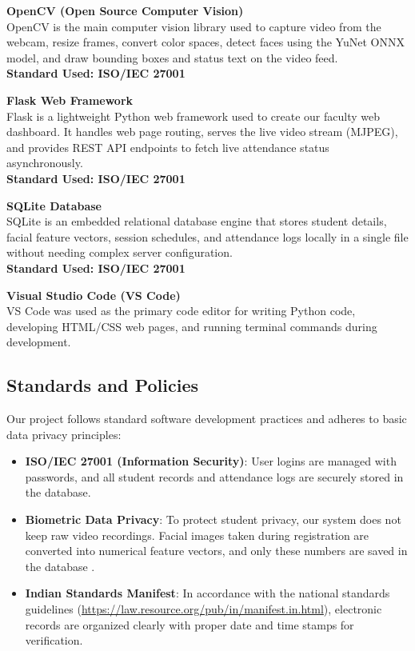 \documentclass[10pt]{report}
\begin{document}
\noindent\textbf{OpenCV (Open Source Computer Vision)}\\
OpenCV is the main computer vision library used to capture video from the webcam, resize frames, convert color spaces, detect faces using the YuNet ONNX model, and draw bounding boxes and status text on the video feed.\\
\textbf{Standard Used: ISO/IEC 27001}

\noindent\textbf{Flask Web Framework}\\
Flask is a lightweight Python web framework used to create our faculty web dashboard. It handles web page routing, serves the live video stream (MJPEG), and provides REST API endpoints to fetch live attendance status asynchronously.\\
\textbf{Standard Used: ISO/IEC 27001}

\noindent\textbf{SQLite Database}\\
SQLite is an embedded relational database engine that stores student details, facial feature vectors, session schedules, and attendance logs locally in a single file without needing complex server configuration.\\
\textbf{Standard Used: ISO/IEC 27001}

\noindent\textbf{Visual Studio Code (VS Code)}\\
VS Code was used as the primary code editor for writing Python code, developing HTML/CSS web pages, and running terminal commands during development.

\subsection{Standards and Policies}
\hspace{0.5cm}Our project follows standard software development practices and adheres to basic data privacy principles:
\begin{itemize}
    \item \textbf{ISO/IEC 27001 (Information Security)}: User logins are managed with passwords, and all student records and attendance logs are securely stored in the database.
    \item \textbf{Biometric Data Privacy}: To protect student privacy, our system does not keep raw video recordings. Facial images taken during registration are converted into numerical feature vectors, and only these numbers are saved in the database \cite{george2024edgeface}.
    \item \textbf{Indian Standards Manifest}: In accordance with the national standards guidelines (\url{https://law.resource.org/pub/in/manifest.in.html}), electronic records are organized clearly with proper date and time stamps for verification.
\end{itemize}
\end{document}
